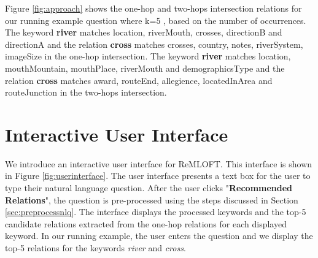\begin{sloppypar}
Figure \ref{fig:approach} shows the one-hop and two-hops intersection relations for our running example question where k=5 , based on the number of occurrences. The keyword \textbf{river} matches {\selectfont location, riverMouth, crosses, directionB and directionA} and the relation \textbf{cross} matches {\selectfont crosses, country, notes, riverSystem, imageSize} in the one-hop intersection. The keyword \textbf{river} matches {\selectfont location, mouthMountain, mouthPlace, riverMouth and demographicsType} and the relation \textbf{cross} matches {\selectfont award, routeEnd, allegience, locatedInArea and routeJunction} in the two-hops intersection.

\section{Interactive User Interface} 
We introduce an interactive user interface for ReMLOFT. This interface is shown in Figure \ref{fig:userinterface}. The user interface presents a text box for the user to type their natural language question. After the user clicks "\textbf{Recommended Relations}", the question is pre-processed using the steps discussed in Section \ref{sec:preprocessnlq}. The interface displays the processed keywords and the top-5 candidate relations extracted from the one-hop relations for each displayed keyword. In our running example, the user enters the question and we display the top-5 relations for the keywords \textit{river} and \textit{cross}.



\end{sloppypar}
